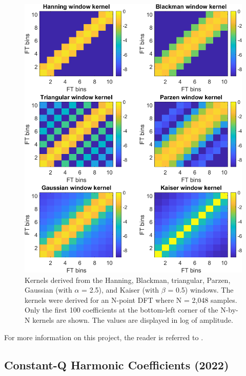 \documentclass{article}
\begin{document}
\begin{figure}[!htb]
\centering
\includegraphics[width=\columnwidth]{Images/kernels.png}
\caption{Kernels derived from the Hanning, Blackman, triangular, Parzen, Gaussian (with $\alpha$ = 2.5), and Kaiser (with $\beta$ = 0.5) windows. The kernels were derived for an N-point DFT where N = 2,048 samples. Only the first 100 coefficients at the bottom-left corner of the N-by-N kernels are shown. The values are displayed in log of amplitude.}
\label{fig:kernels}
\end{figure}

For more information on this project, the reader is referred to \cite{article_rafii_nov2018}.


\subsection{Constant-Q Harmonic Coefficients (2022)}
\label{ssec:cqhc}
\end{document}
